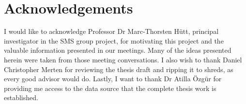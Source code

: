 \chapter*{Acknowledgements}

I would like to acknowledge Professor Dr Marc-Thorsten Hütt, principal investigator in the SMS group project, for motivating this project and the valuable information presented in our meetings. Many of the ideas presented herein were taken from those meeting conversations. I also wish to thank Daniel Christopher Merten for reviewing the thesis draft and ripping it to shreds, as every good advisor would do. Lastly, I want to thank Dr Atilla Özgür for providing me access to the data source that the complete thesis work is established.
\clearpage